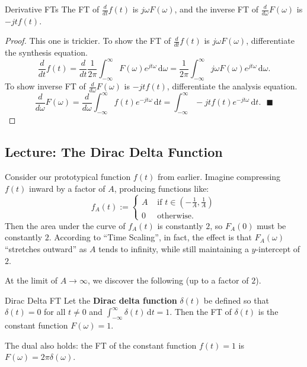 \begin{theorem}{Derivative FTs}
    The FT of $\frac{d}{dt} f(t)$ is $j\omega F(\omega)$,
    and the inverse FT of $\frac{d}{d\omega} F(\omega)$ is $-jt f(t)$.
\end{theorem}

\begin{proof}
    This one is trickier.  To show the FT of $\frac{d}{dt} f(t)$ is $j\omega F(\omega)$,
    differentiate the synthesis equation.
    \[ \frac{d}{dt} f(t)
    = \frac{d}{dt} \frac{1}{2\pi} \int_{-\infty}^{\infty} F(\omega) e^{jt\omega} \, \mathrm{d}\omega
    = \frac{1}{2\pi} \int_{-\infty}^{\infty} j\omega F(\omega) e^{jt\omega} \, \mathrm{d}\omega. \]
    To show inverse FT of $\frac{d}{d\omega} F(\omega)$ is $-jt f(t)$,
    differentiate the analysis equation.
    \[ \frac{d}{d\omega} F(\omega)
    = \frac{d}{d\omega} \int_{-\infty}^{\infty} f(t) e^{-jt \omega} \, \mathrm{d}t
    = \int_{-\infty}^{\infty} -jt f(t) e^{-jt \omega} \, \mathrm{d}t. ~~~ \blacksquare \]
\end{proof}

\subsection{Lecture: The Dirac Delta Function}

Consider our prototypical function $f(t)$ from earlier.
Imagine compressing $f(t)$ inward by a factor of $A$, producing functions like:
\[ f_A(t) := \begin{cases}
    A & \text{ if } t \in \left(-\frac{1}{A}, \frac{1}{A}\right) \\
    0 & \text{ otherwise.}
\end{cases} \]
Then the area under the curve of $f_A(t)$ is constantly $2$,
so $F_A(0)$ must be constantly $2$.
According to ``Time Scaling'', in fact,
the effect is that $F_A(\omega)$ ``stretches outward''
as $A$ tends to infinity, while still maintaining a $y$-intercept of $2$.

At the limit of $A \to \infty$, we discover the following
(up to a factor of $2$).

\begin{theorem}{Dirac Delta FT}
    Let the \textbf{Dirac delta function} $\delta(t)$
    be defined so that $\delta(t) = 0$ for all $t \neq 0$
    and $\int_{-\infty}^{\infty} \delta(t) \, \mathrm{d}t = 1$.
    Then the FT of $\delta(t)$ is the constant function $F(\omega) = 1$.

    The dual also holds: the FT of the constant function $f(t) = 1$
    is $F(\omega) = 2\pi \delta(\omega)$.
\end{theorem}

